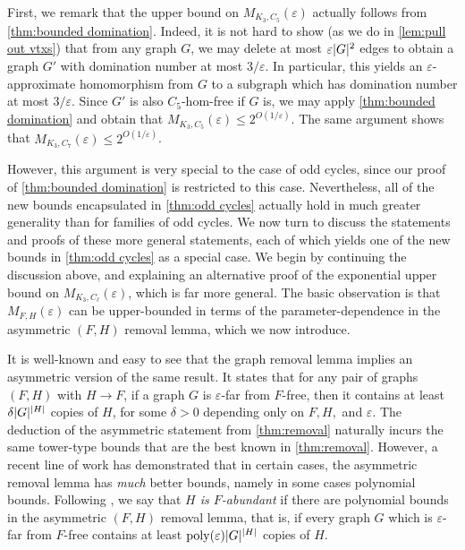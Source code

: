 \documentclass[reqno, english, 12pt]{amsart}
\theoremstyle{plain}
\theoremstyle{remark}
\DeclareMathOperator{\poly}{poly}
\DeclarePairedDelimiter{\abs}{\lvert}{\rvert}
\renewcommand{\leq}{\leqslant}
\begin{document}
First, we remark that the upper bound on $M_{K_3,C_5}(\varepsilon)$ actually follows from \cref{thm:bounded domination}. Indeed, it is not hard to show (as we do in \cref{lem:pull out vtxs}) that from any graph $G$, we may delete at most $\varepsilon \abs G^2$ edges to obtain a graph $G'$ with domination number at most $3/\varepsilon$. In particular, this yields an $\varepsilon$-approximate homomorphism from $G$ to a subgraph which has domination number at most $3/\varepsilon$. Since $G'$ is also $C_5$-hom-free if $G$ is, we may apply \cref{thm:bounded domination} and obtain that $M_{K_3,C_5}(\varepsilon)\leq 2^{O(1/\varepsilon)}$. The same argument shows that $M_{K_3,C_7}(\varepsilon) \leq 2^{O(1/\varepsilon)}$. 

However, this argument is very special to the case of odd cycles, since our proof of \cref{thm:bounded domination} is restricted to this case. Nevertheless, all of the new bounds encapsulated in \cref{thm:odd cycles} actually hold in much greater generality than for families of odd cycles. We now turn to discuss the statements and proofs of these more general statements, each of which yields one of the new bounds in \cref{thm:odd cycles} as a special case. We begin by continuing the discussion above, and explaining an alternative proof of the exponential upper bound on $M_{K_3,C_\ell}(\varepsilon)$, 
which is far more general. The basic  observation is that $M_{F,H}(\varepsilon)$ can be upper-bounded in terms of the parameter-dependence in the asymmetric $(F,H)$ removal lemma, which we now introduce.

It is well-known and easy to see that the graph removal lemma implies an asymmetric version of the same result. It states that for any pair of graphs $(F,H)$ with $H \to F$, if a graph $G$ is $\varepsilon$-far from $F$-free, then it contains at least $\delta \abs G^{\abs H}$ copies of $H$, for some $\delta>0$ depending only on $F,H,$ and $\varepsilon$. The deduction of the asymmetric statement from \cref{thm:removal} naturally incurs the same tower-type bounds that are the best known in \cref{thm:removal}. However, a recent line of work \cite{Csaba,GSW,GHIM,2501.15861} has demonstrated that in certain cases, the asymmetric removal lemma has \emph{much} better bounds, namely in some cases polynomial bounds. Following \cite{GSW}, we say that \emph{$H$ is $F$-abundant} if there are polynomial bounds in the asymmetric $(F,H)$ removal lemma, that is, if every graph $G$ which is $\varepsilon$-far from $F$-free contains at least $\poly(\varepsilon) \abs G^{\abs H}$ copies of $H$.
\end{document}
